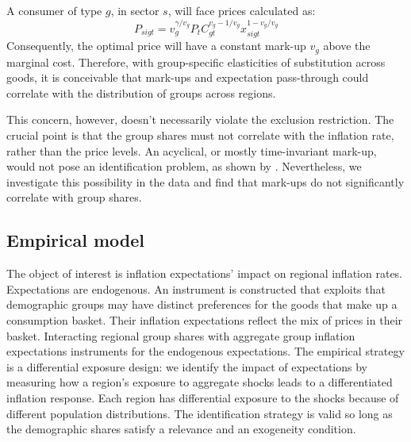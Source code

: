 \documentclass[12pt]{article}
\begin{document}
A consumer of type $g$, in sector $s$, will face prices calculated as:
\begin{equation}
P_{sigt} = v^{\gamma/v_g}_gP_tC_{gt}^{v_g-1/v_g}x_{sigt}^{1-v_g/v_g}
\end{equation}
Consequently, the optimal price will have a constant mark-up $v_g$ above the marginal cost. Therefore, with group-specific elasticities of substitution across goods, it is conceivable that mark-ups and expectation pass-through could correlate with the distribution of groups across regions.

This concern, however, doesn't necessarily violate the exclusion restriction. The crucial point is that the group shares must not correlate with the inflation rate, rather than the price levels. An acyclical, or mostly time-invariant mark-up, would not pose an identification problem, as shown by \cite{AndersonRebeloWong:WP}. Nevertheless, we investigate this possibility in the data and find that mark-ups do not significantly correlate with group shares.

\subsection{Empirical model}

The object of interest is inflation expectations' impact on regional inflation rates. Expectations are endogenous. An instrument is constructed that exploits that demographic groups may have distinct preferences for the goods that make up a consumption basket. Their inflation expectations reflect the mix of prices in their basket. Interacting regional group shares with aggregate group inflation expectations instruments for the endogenous expectations. The empirical strategy is a differential exposure design: we identify the impact of expectations by measuring how a region's exposure to aggregate shocks leads to a differentiated inflation response. Each region has differential exposure to the shocks because of different population distributions. The identification strategy is valid so long as the demographic shares satisfy a relevance and an exogeneity condition.
\end{document}
